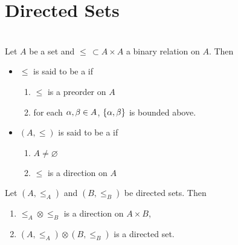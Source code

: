 \documentclass{book}
\begin{document}
	
	
	
	
	
	
	
	
	
	
	
	
	
	
	
	
	
	
	
	
	
	
	
	
	
	
	
	
	
	
	
	
	
	\newpage
	\section{Directed Sets}
	
	\begin{defn}    \\
		Let $A$ be a set and $\leq \, \subset A \times A$ a binary relation on $A$. Then 
		\begin{itemize}
			\item $\leq$ is said to be a  if
			\begin{enumerate}
				\item $\leq$ is a preorder on $A$
				\item for each $\alpha, \beta \in A$, $\{\alpha, \beta\}$ is bounded above. 
			\end{enumerate}
			\item $(A, \leq)$ is said to be a  if
			\begin{enumerate}
				\item $A \neq \varnothing$
				\item $\leq$ is a direction on $A$
			\end{enumerate}
		\end{itemize}
	\end{defn}
	
	\begin{ex} 
		Let $(A, \leq_A)$ and $(B, \leq_B)$ be directed sets. Then 
		\begin{enumerate}
			\item $\leq_A \otimes \leq_B$ is a direction on $A \times B$,
			\item $(A, \leq_A) \otimes (B, \leq_B)$ is a directed set.
		\end{enumerate}
	\end{ex}
	
\end{document}
